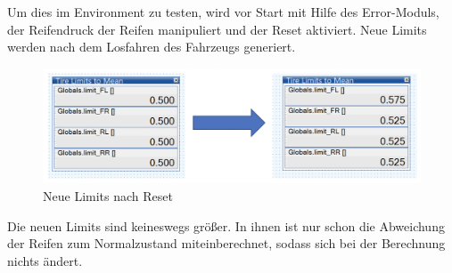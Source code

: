 Um dies im Environment zu testen, wird vor Start mit Hilfe des Error-Moduls, der Reifendruck der Reifen manipuliert und der Reset aktiviert.
Neue Limits werden nach dem Losfahren des Fahrzeugs generiert.
\begin{figure}[H]
	\centering
	\includegraphics[width=1\linewidth]{../Graphiken/ResetDone.png}
	\caption{Neue Limits nach Reset}
	\label{fig:ResetState}
\end{figure}
Die neuen Limits sind keineswegs größer. In ihnen ist nur schon die Abweichung der Reifen zum Normalzustand miteinberechnet, sodass sich bei der Berechnung nichts ändert.